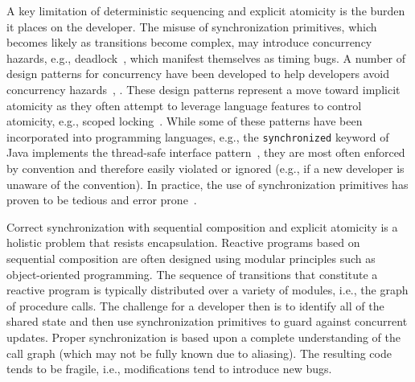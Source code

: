 A key limitation of deterministic sequencing and explicit atomicity is the burden it places on the developer.
The misuse of synchronization primitives, which becomes likely as transitions become complex, may introduce concurrency hazards, e.g., deadlock~\cite{dijkstra1965cooperating}, which manifest themselves as timing bugs.
A number of design patterns for concurrency have been developed to help developers avoid concurrency hazards~\cite{schmidt2000pattern}, \cite{lea2000concurrent}.
These design patterns represent a move toward implicit atomicity as they often attempt to leverage language features to control atomicity, e.g., scoped locking~\cite{schmidt2000pattern}.
While some of these patterns have been incorporated into programming languages, e.g., the \verb+synchronized+ keyword of Java implements the thread-safe interface pattern~\cite{schmidt2000pattern}, they are most often enforced by convention and therefore easily violated or ignored (e.g., if a new developer is unaware of the convention).
In practice, the use of synchronization primitives has proven to be tedious and error prone~\cite{sutter2005software}.

Correct synchronization with sequential composition and explicit atomicity is a holistic problem that resists encapsulation.
Reactive programs based on sequential composition are often designed using modular principles such as object-oriented programming.
The sequence of transitions that constitute a reactive program is typically distributed over a variety of modules, i.e., the graph of procedure calls.
The challenge for a developer then is to identify all of the shared state and then use synchronization primitives to guard against concurrent updates.
Proper synchronization is based upon a complete understanding of the call graph (which may not be fully known due to aliasing).
The resulting code tends to be fragile, i.e., modifications tend to introduce new bugs.


